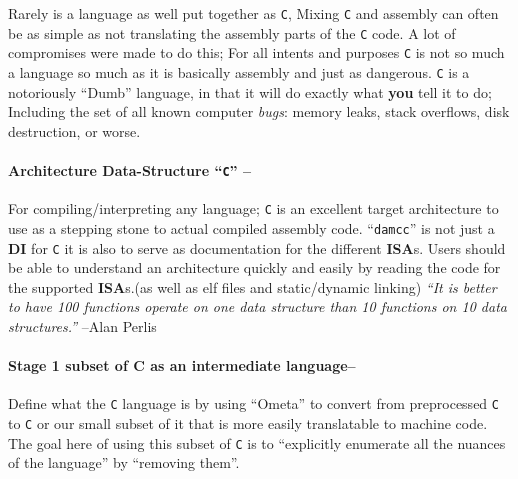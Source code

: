 Rarely is a language as well put together as \texttt{C}, Mixing
\texttt{C} and assembly can often be as simple as not translating the
assembly parts of the \texttt{C} code. A lot of compromises were made to
do this; For all intents and purposes \texttt{C} is not so much a
language so much as it is basically assembly and just as dangerous.
\texttt{C} is a notoriously ``Dumb'' language, in that it will do
exactly what \textbf{you} tell it to do; Including the set of all known
computer \emph{bugs}: memory leaks, stack overflows, disk destruction,
or worse.

\hypertarget{architecture-data-structure-c}{%
\paragraph{\texorpdfstring{Architecture Data-Structure ``\texttt{C}''
--}{Architecture Data-Structure ``C'' --}}\label{architecture-data-structure-c}}

For compiling/interpreting any language; \texttt{C} is an excellent
target architecture to use as a stepping stone to actual compiled
assembly code. ``\texttt{damcc}'' is not just a \textbf{DI} for
\texttt{C} it is also to serve as documentation for the different
\textbf{ISA}s. Users should be able to understand an architecture
quickly and easily by reading the code for the supported
\textbf{ISA}s.(as well as elf files and static/dynamic linking)
\emph{``It is better to have 100 functions operate on one data structure
than 10 functions on 10 data structures.''} --Alan Perlis

\hypertarget{stage-1-subset-of-c-as-an-intermediate-language}{%
\paragraph{Stage 1 subset of C as an intermediate
language--}\label{stage-1-subset-of-c-as-an-intermediate-language}}

Define what the \texttt{C} language is by using ``Ometa'' to convert
from preprocessed \texttt{C} to \texttt{C} or our small subset of it
that is more easily translatable to machine code. The goal here of using
this subset of \texttt{C} is to ``explicitly enumerate all the nuances
of the language'' by ``removing them''.

